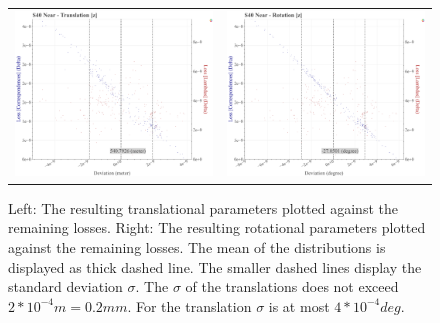 \begin{figure}[!ht]
\begin{tabular}{cc}
    \includegraphics[width=0.45 \linewidth]{diagrams/calibration/s40_n_near/parameters.csv/Translation[z]_vs_Loss[Correspondences]_vs_Loss[Lambdas]_cluster_All.png} &
    \includegraphics[width=0.45 \linewidth]{diagrams/calibration/s40_n_near/parameters.csv/Rotation[z]_vs_Loss[Correspondences]_vs_Loss[Lambdas]_cluster_All.png} \\
\end{tabular}
\caption{
  Left: The resulting translational parameters plotted against the remaining losses. 
  Right: The resulting rotational parameters plotted against the remaining losses.
  The mean of the distributions is displayed as thick dashed line. The smaller dashed lines display the standard deviation $\sigma$.
  The $\sigma$ of the translations does not exceed $2 * 10^{-4} m = 0.2 mm$.
  For the translation $\sigma$ is at most $4 * 10^{-4} deg$.
  }
\label{fig:static_calibration_algorithmic_error_s40_n_near}
\end{figure}

